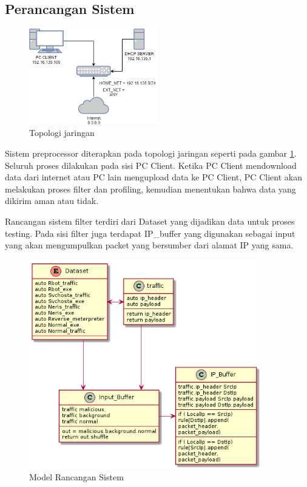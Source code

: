 \documentclass[./skripsi.tex]{subfiles}
\begin{document}
\subsection{Perancangan Sistem}
\begin{figure}
    \centering
    \includegraphics[width=0.5\textwidth]{public/assets/img/Topologi.png}
    \caption{Topologi jaringan}
    \label{fig:topologi_jaringan}
\end{figure}
\par Sistem preprocessor diterapkan pada topologi jaringan seperti pada gambar \ref{fig:topologi_jaringan}. Seluruh proses dilakukan pada sisi PC Client. Ketika PC Client mendownload data dari internet atau PC lain mengupload data ke PC Client, PC Client akan melakukan proses filter dan profiling, kemudian menentukan bahwa data yang dikirim aman atau tidak.
\par Rancangan sistem filter terdiri dari Dataset yang dijadikan data untuk proses testing. Pada sisi filter juga terdapat IP\_buffer yang digunakan sebagai input yang akan mengumpulkan packet yang bersumber dari alamat IP yang sama.

\begin{figure}%
    \centering
    \includegraphics[width=0.9\textwidth]{public/assets/img/RancanganSistemPenelitian.png}
    \caption{Model Rancangan Sistem}
    \label{fig:rancanganpenelitian}
\end{figure}
\end{document}

